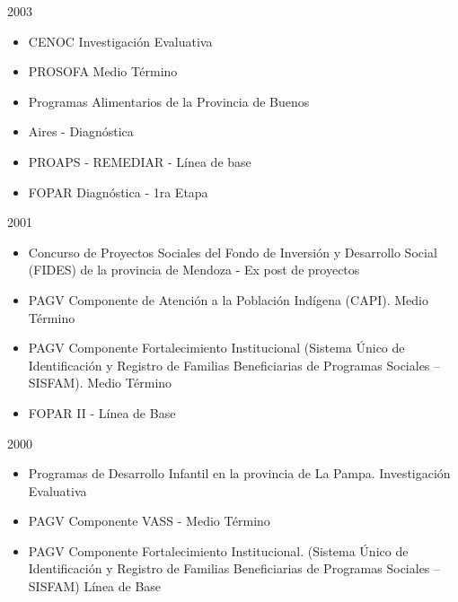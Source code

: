 \begin{description}
\begin{itemize}
        \end{itemize}
    \item{2003}
        \begin{itemize}
            \item CENOC Investigación Evaluativa
            \item PROSOFA Medio Término
            \item Programas Alimentarios de la Provincia de Buenos
            \item Aires - Diagnóstica
            \item PROAPS - REMEDIAR - Línea de base
            \item FOPAR Diagnóstica - 1ra Etapa
        \end{itemize}
    \item{2001}
        \begin{itemize}
            \item Concurso de Proyectos Sociales del Fondo de Inversión y Desarrollo Social (FIDES)
de la provincia de Mendoza - Ex post de proyectos
            \item PAGV Componente de Atención a la Población Indígena (CAPI). Medio Término
            \item PAGV Componente Fortalecimiento Institucional (Sistema Único de Identificación y Registro de Familias Beneficiarias de  Programas Sociales – SISFAM). Medio Término
            \item FOPAR II - Línea de Base
        \end{itemize}
        
    \item{2000}
        \begin{itemize}
        \item Programas de Desarrollo Infantil en la provincia de La Pampa. Investigación Evaluativa
            \item PAGV Componente VASS - Medio Término
            \item PAGV Componente Fortalecimiento Institucional. (Sistema Único de Identificación y Registro de Familias Beneficiarias de Programas Sociales – SISFAM) Línea de Base
        \end{itemize}
    \end{description}
